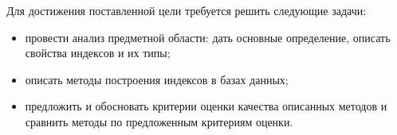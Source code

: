 Для достижения поставленной цели требуется решить следующие задачи:
\begin{itemize}
    \item провести анализ предметной области: дать основные определение, описать
        свойства индексов и их типы;
    \item описать методы построения индексов в базах данных;
    \item предложить и обосновать критерии оценки качества описанных методов
      и сравнить методы по предложенным критериям оценки.
\end{itemize}
